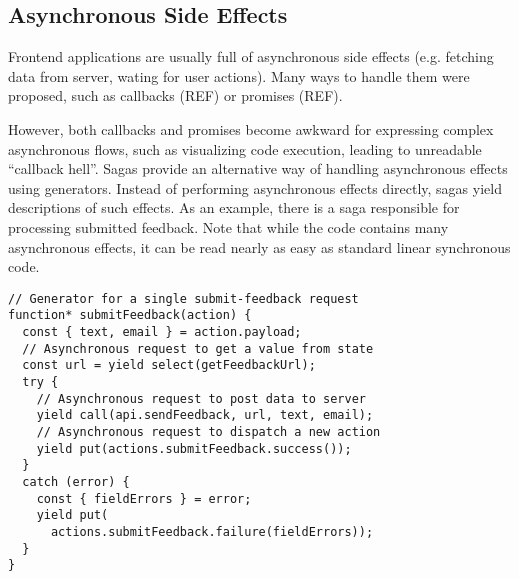 \subsection{Asynchronous Side Effects}
\label{sec:robomission-asynchronous-side-effects}

Frontend applications are usually full of asynchronous side effects
(e.g. fetching data from server, wating for user actions).
Many ways to handle them were proposed,
such as callbacks (REF) or promises (REF).

However, both callbacks and promises become awkward for expressing complex
asynchronous flows, such as visualizing code execution,
leading to unreadable ``callback hell''. %
Sagas provide an alternative way of handling asynchronous effects using generators.
Instead of performing asynchronous effects directly, sagas yield
descriptions of such effects.
As an example, there is a saga responsible for processing
submitted feedback.
Note that while the code contains many asynchronous effects,
it can be read nearly as easy as standard linear synchronous code.


\begin{lstlisting}[language=ES6]
// Generator for a single submit-feedback request
function* submitFeedback(action) {
  const { text, email } = action.payload;
  // Asynchronous request to get a value from state
  const url = yield select(getFeedbackUrl);
  try {
    // Asynchronous request to post data to server
    yield call(api.sendFeedback, url, text, email);
    // Asynchronous request to dispatch a new action
    yield put(actions.submitFeedback.success());
  }
  catch (error) {
    const { fieldErrors } = error;
    yield put(
      actions.submitFeedback.failure(fieldErrors));
  }
}
\end{lstlisting}



